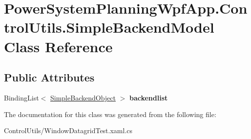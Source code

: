\hypertarget{class_power_system_planning_wpf_app_1_1_control_utils_1_1_simple_backend_model}{}\section{Power\+System\+Planning\+Wpf\+App.\+Control\+Utils.\+Simple\+Backend\+Model Class Reference}
\label{class_power_system_planning_wpf_app_1_1_control_utils_1_1_simple_backend_model}
\subsection*{Public Attributes}
\begin{DoxyCompactItemize}
\item 
Binding\+List$<$ \hyperlink{class_power_system_planning_wpf_app_1_1_control_utils_1_1_simple_backend_object}{Simple\+Backend\+Object} $>$ {\bfseries backendlist}\hypertarget{class_power_system_planning_wpf_app_1_1_control_utils_1_1_simple_backend_model_a69a6c81750e3c4af0ea2a399592499c6}{}\label{class_power_system_planning_wpf_app_1_1_control_utils_1_1_simple_backend_model_a69a6c81750e3c4af0ea2a399592499c6}

\end{DoxyCompactItemize}


The documentation for this class was generated from the following file\+:\begin{DoxyCompactItemize}
\item 
Control\+Utils/Window\+Datagrid\+Test.\+xaml.\+cs\end{DoxyCompactItemize}
